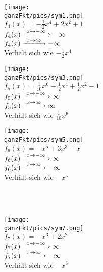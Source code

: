 \begin{minipage}{\textwidth}
	\begin{minipage}{0.32\textwidth}\centering
		\texttt{[image: \\ganzFkt/pics/sym1.png]}\\
		\(f_4(x)= -\frac{1}{2}x^4+2x^2+1\)\\
		\textcolor{loes}{\(f_4(x)\xrightarrow{\hphantom{\ }x\to-\infty\hphantom{\ }}-\infty\)\\
			\(f_4(x)\xrightarrow{\hphantom{\ }x\to\infty\hphantom{\ }}-\infty\)}\\
		\textcolor{loes}{Verhält sich wie \(-\frac{1}{2}x^4\)}
	\end{minipage}
	\begin{minipage}{0.32\textwidth}\centering
		\texttt{[image: \\ganzFkt/pics/sym3.png]}\\
		\(f_5(x)=\frac{1}{10}x^6-\frac{1}{2}x^4+\frac{1}{2}x^2-1\)\\
		\textcolor{loes}{\(f_5(x)\xrightarrow{\hphantom{\ }x\to-\infty\hphantom{\ }}\infty\)\\
			\(f_5(x)\xrightarrow{\hphantom{\ }x\to\infty\hphantom{\ }}\infty\)}\\
		\textcolor{loes}{Verhält sich wie \(\frac{1}{10}x^6\)}
	\end{minipage}
	\begin{minipage}{0.32\textwidth}\centering
		\texttt{[image: \\ganzFkt/pics/sym5.png]}\\
		\(f_6(x)=-x^5+3x^3-x\)\\
		\textcolor{loes}{\(f_6(x)\xrightarrow{\hphantom{\ }x\to-\infty\hphantom{\ }}\infty\)\\
			\(f_6(x)\xrightarrow{\hphantom{\ }x\to\infty\hphantom{\ }}-\infty\)}\\
		\textcolor{loes}{Verhält sich wie \(-x^5\)}
	\end{minipage}\\ \vspace{0.2cm}\\
	\begin{minipage}{0.32\textwidth}\centering
		\texttt{[image: \\ganzFkt/pics/sym7.png]}\\
		\(f_7(x)=-x^3+2x^2\)\\
		\textcolor{loes}{\(f_7(x)\xrightarrow{\hphantom{\ }x\to-\infty\hphantom{\ }}\infty\)\\
			\(f_7(x)\xrightarrow{\hphantom{\ }x\to\infty\hphantom{\ }}-\infty\)}\\
		\textcolor{loes}{Verhält sich wie \(-x^3\)}

\end{minipage}
\end{minipage}
